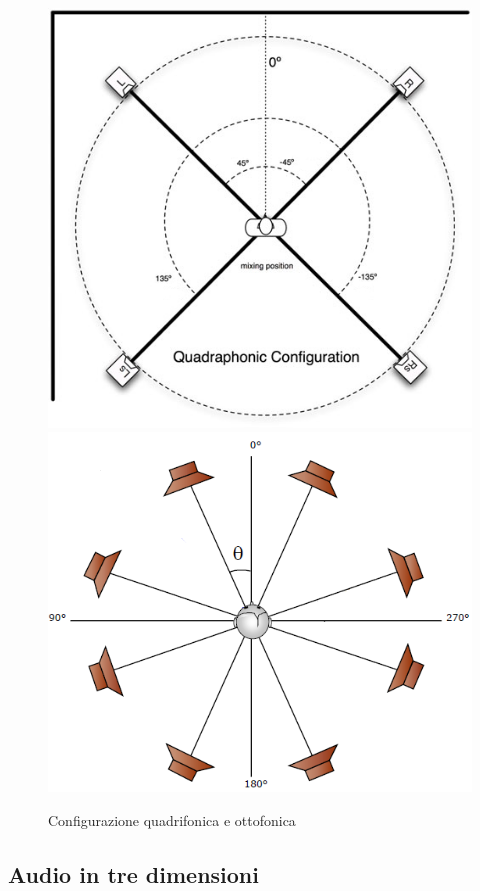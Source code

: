 \documentclass[12pt,a4paper]{report}
\begin{document}
\begin{figure}[htbp]
	\centering
	\includegraphics[scale=0.35]{figures/quad.jpg}\includegraphics[scale=0.55]{figures/ottofonia.png}
	\caption {Configurazione quadrifonica e ottofonica}
	\label{fig:quadrifonia}
	\end{figure}

\subsection{Audio in tre dimensioni}
\end{document}
